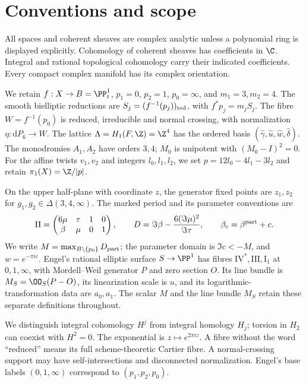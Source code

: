 \section*{Conventions and scope}
All spaces and coherent sheaves are complex analytic unless a polynomial ring is displayed explicitly. Cohomology of coherent sheaves has coefficients in $\C$. Integral and rational topological cohomology carry their indicated coefficients. Every compact complex manifold has its complex orientation.

We retain $f:X\to B=\PP^1_t$, $p_1=0$, $p_2=1$, $p_0=\infty$, and $m_1=3,m_2=4$. The smooth bielliptic reductions are $S_j=(f^{-1}(p_j))_{\rm red}$, with $f^*p_j=m_jS_j$. The fibre $W=f^{-1}(p_0)$ is reduced, irreducible and normal crossing, with normalization $\eta:\mathrm dP_6\to W$. The lattice $\Lambda=H_1(F,\Z)=\Z^4$ has the ordered basis $(\widehat\gamma,\widehat u,\widehat w,\widehat\delta)$. The monodromies $A_1,A_2$ have orders $3,4$; $M_0$ is unipotent with $(M_0-I)^2=0$. For the affine twists $v_1,v_2$ and integers $l_0,l_1,l_2$, we set $p=12l_0-4l_1-3l_2$ and retain $\pi_1(X)=\Z/|p|$.

On the upper half-plane with coordinate $z$, the generator fixed points are $z_1,z_2$ for $g_1,g_2\in\Delta(3,4,\infty)$. The marked period and its parameter conventions are
\[
 \Pi=\begin{pmatrix}6\mu&\tau&1&0\\ \beta&\mu&0&1\end{pmatrix},\qquad
 D=\Im\beta-\frac{6(\Im\mu)^2}{\Im\tau},\qquad
 \beta_c=\beta^{\rm part}+c.
\]
We write $M=\max_{B\setminus\{p_0\}}D_{\rm part}$; the parameter domain is $\Im c<-M$, and $w=e^{-\pi ic}$. Engel's rational elliptic surface $S\to\PP^1$ has fibres $\mathrm{IV}^*,\mathrm{III},\mathrm I_1$ at $0,1,\infty$, with Mordell--Weil generator $P$ and zero section $O$. Its line bundle is $M_S=\OO_S(P-O)$, its linearization scale is $u$, and its logarithmic-transformation data are $a_0,a_1$. The scalar $M$ and the line bundle $M_S$ retain these separate definitions throughout.

We distinguish integral cohomology $H^j$ from integral homology $H_j$; torsion in $H_2$ can coexist with $H^2=0$. The exponential is $z\mapsto e^{2\pi iz}$. A fibre without the word ``reduced'' means its full scheme-theoretic Cartier fibre. A normal-crossing support may have self-intersections and disconnected normalization. Engel's base labels $(0,1,\infty)$ correspond to $(p_1,p_2,p_0)$.


